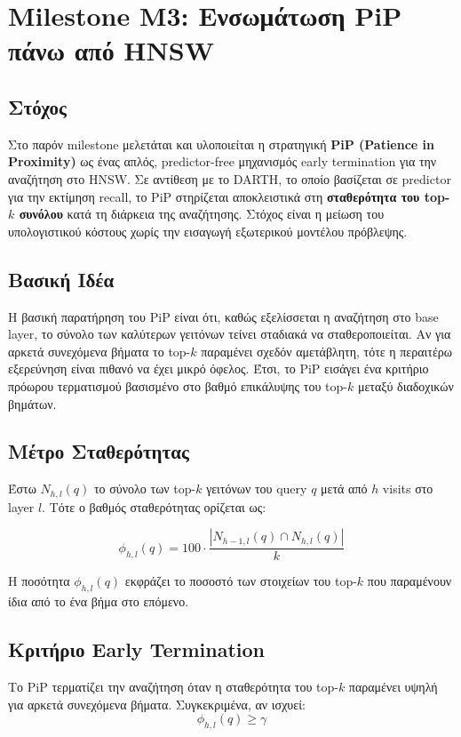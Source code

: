 \documentclass[12pt,a4paper]{article}
\begin{document}
\section{Milestone M3: Ενσωμάτωση PiP πάνω από HNSW}

\subsection{Στόχος}
Στο παρόν milestone μελετάται και υλοποιείται η στρατηγική \textbf{PiP (Patience in Proximity)} ως ένας απλός, predictor-free μηχανισμός early termination για την αναζήτηση στο HNSW. 
Σε αντίθεση με το DARTH, το οποίο βασίζεται σε predictor για την εκτίμηση recall, το PiP στηρίζεται αποκλειστικά στη \textbf{σταθερότητα του top-$k$ συνόλου} κατά τη διάρκεια της αναζήτησης. Στόχος είναι η μείωση του υπολογιστικού κόστους χωρίς την εισαγωγή εξωτερικού μοντέλου πρόβλεψης.

\subsection{Βασική Ιδέα}
Η βασική παρατήρηση του PiP είναι ότι, καθώς εξελίσσεται η αναζήτηση στο base layer, το σύνολο των καλύτερων γειτόνων τείνει σταδιακά να σταθεροποιείται. Αν για αρκετά συνεχόμενα βήματα το top-$k$ παραμένει σχεδόν αμετάβλητη, τότε η περαιτέρω εξερεύνηση είναι πιθανό να έχει μικρό όφελος. Έτσι, το PiP εισάγει ένα κριτήριο πρόωρου τερματισμού βασισμένο στο βαθμό επικάλυψης του top-$k$ μεταξύ διαδοχικών βημάτων.

\subsection{Μέτρο Σταθερότητας}
Έστω $N_{h,l}(q)$ το σύνολο των top-$k$ γειτόνων του query $q$ μετά από $h$ visits στο layer $l$. Τότε ο βαθμός σταθερότητας ορίζεται ως:

\[
\phi_{h,l}(q)=100 \cdot \frac{|N_{h-1,l}(q)\cap N_{h,l}(q)|}{k}
\]

Η ποσότητα $\phi_{h,l}(q)$ εκφράζει το ποσοστό των στοιχείων του top-$k$ που παραμένουν ίδια από το ένα βήμα στο επόμενο.

\subsection{Κριτήριο Early Termination}
Το PiP τερματίζει την αναζήτηση όταν η σταθερότητα του top-$k$ παραμένει υψηλή για αρκετά συνεχόμενα βήματα. Συγκεκριμένα, αν ισχυεί:
\[
\phi_{h,l}(q) \ge \gamma
\]
\end{document}
